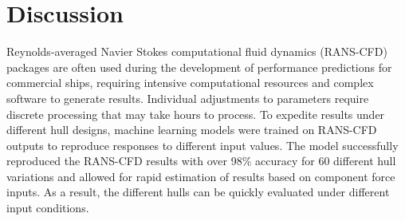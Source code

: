 \documentclass[twoside,twocolumn]{article}
\begin{document}

\section{Discussion}

Reynolds-averaged Navier Stokes computational fluid dynamics (RANS-CFD) packages are often used during the development of performance predictions for commercial ships, requiring intensive computational resources and complex software to generate results. Individual adjustments to parameters require discrete processing that may take hours to process. To expedite results under different hull designs, machine learning models were trained on RANS-CFD outputs to reproduce responses to different input values. The model successfully reproduced the RANS-CFD results with over 98\% accuracy for 60 different hull variations and allowed for rapid estimation of results based on component force inputs. As a result, the different hulls can be quickly evaluated under different input conditions.



{}


\appendix
\end{document}
